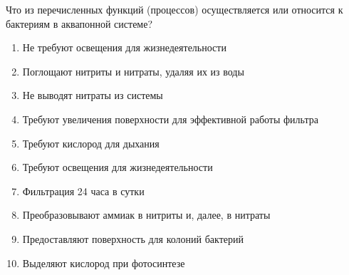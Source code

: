 
Что из перечисленных функций (процессов) осуществляется или относится к бактериям в аквапонной системе?  

\begin{enumerate}
    \item Не требуют освещения для жизнедеятельности
    \item Поглощают нитриты и нитраты, удаляя их из воды
    \item Не выводят нитраты из системы
    \item Требуют увеличения поверхности для эффективной работы фильтра
    \item Требуют кислород для дыхания
    \item Требуют освещения для жизнедеятельности
    \item Фильтрация 24 часа в сутки
    \item Преобразовывают аммиак в нитриты и, далее, в нитраты
    \item Предоставляют поверхность для колоний бактерий
    \item Выделяют кислород при фотосинтезе
\end{enumerate}